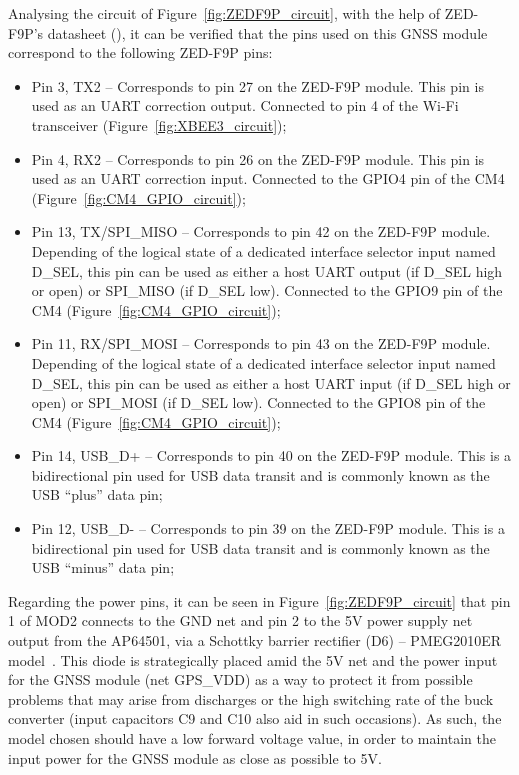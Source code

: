 Analysing the circuit of Figure~\ref{fig:ZEDF9P_circuit}, with the help of ZED-F9P's datasheet (\cite{ZED_F9P}), it can be verified that the pins used on this GNSS module correspond to the following ZED-F9P pins:
\begin{itemize}
	\item Pin 3, TX2 -- Corresponds to pin 27 on the ZED-F9P module. This pin is used as an UART correction output. Connected to pin 4 of the Wi-Fi transceiver (Figure~\ref{fig:XBEE3_circuit});

	\item Pin 4, RX2 -- Corresponds to pin 26 on the ZED-F9P module. This pin is used as an UART correction input. Connected to the GPIO4 pin of the CM4 (Figure~\ref{fig:CM4_GPIO_circuit});
 
	\item Pin 13, TX/SPI\_MISO -- Corresponds to pin 42 on the ZED-F9P module. Depending of the logical state of a dedicated interface selector input named D\_SEL, this pin can be used as either a host UART output (if D\_SEL high or open) or SPI\_MISO (if D\_SEL low). Connected to the GPIO9 pin of the CM4 (Figure~\ref{fig:CM4_GPIO_circuit});

	\item Pin 11, RX/SPI\_MOSI -- Corresponds to pin 43 on the ZED-F9P module. Depending of the logical state of a dedicated interface selector input named D\_SEL, this pin can be used as either a host UART input (if D\_SEL high or open) or SPI\_MOSI (if D\_SEL low). Connected to the GPIO8 pin of the CM4 (Figure~\ref{fig:CM4_GPIO_circuit});

	\item Pin 14, USB\_D+ -- Corresponds to pin 40 on the ZED-F9P module. This is a bidirectional pin used for USB data transit and is commonly known as the USB ``plus'' data pin;

	\item Pin 12, USB\_D- -- Corresponds to pin 39 on the ZED-F9P module. This is a bidirectional pin used for USB data transit and is commonly known as the USB ``minus'' data pin;
\end{itemize}

Regarding the power pins, it can be seen in Figure~\ref{fig:ZEDF9P_circuit} that pin 1 of MOD2 connects to the GND net and pin 2 to the 5V power supply net output from the AP64501, via a Schottky barrier rectifier (D6) -- PMEG2010ER model~\cite{PMEG2010ER}. This diode is strategically placed amid the 5V net and the power input for the GNSS module (net GPS\_VDD) as a way to protect it from possible problems that may arise from discharges or the high switching rate of the buck converter (input capacitors C9 and C10 also aid in such occasions). As such, the model chosen should have a low forward voltage value, in order to maintain the input power for the GNSS module as close as possible to 5V.

